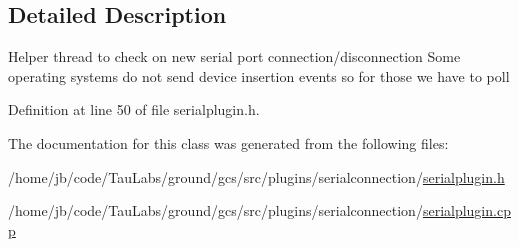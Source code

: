 \subsection{\-Detailed \-Description}
\-Helper thread to check on new serial port connection/disconnection \-Some operating systems do not send device insertion events so for those we have to poll 

\-Definition at line 50 of file serialplugin.\-h.



\-The documentation for this class was generated from the following files\-:\begin{DoxyCompactItemize}
\item 
/home/jb/code/\-Tau\-Labs/ground/gcs/src/plugins/serialconnection/\hyperlink{serialplugin_8h}{serialplugin.\-h}\item 
/home/jb/code/\-Tau\-Labs/ground/gcs/src/plugins/serialconnection/\hyperlink{serialplugin_8cpp}{serialplugin.\-cpp}\end{DoxyCompactItemize}
